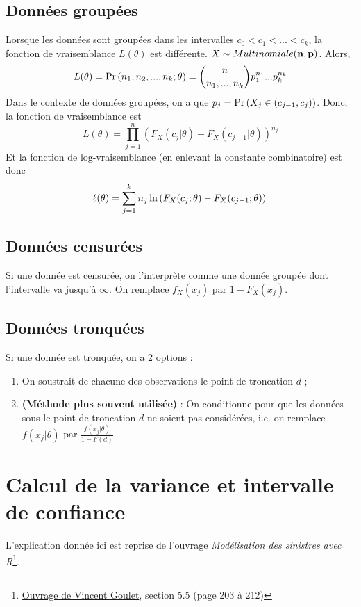 \documentclass[12pt, french]{report}
\begin{document}
\subsection{Données groupées}
Lorsque les données sont groupées dans les intervalles $c_0 < c_1 < ... < c_k$, la fonction de vraisemblance $L(\theta)$ est différente. $X \sim Multinomiale(\mathbf{n}, \mathbf{p})$. Alors,
\begin{equation}
L(\theta) = \Pr \left( n_1, n_2, ..., n_k ; \theta \right) = \binom{n}{n_1, ..., n_k} p_1^{n_1} ... p_k^{n_k}
\end{equation}
Dans le contexte de données groupées, on a que $p_j= \Pr \left( X_j \in (c_{j-1}, c_{j}) \right)$. Donc, la fonction de vraisemblance est
\[L(\theta) =  \prod_{j=1}^{n}  \left( F_X(c_{j} | \theta) - F_X(c_{j-1} | \theta) \right)^{n_j}   \]
Et la fonction de log-vraisemblance (en enlevant la constante combinatoire) est donc
\begin{equation}
\label{eq:log-vraisemblance_group}
\ell(\theta)  = \sum_{j=1}^{k} n_j \ln \left( F_X(c_{j} ; \theta) - F_X(c_{j-1} ; \theta) \right) \\
\end{equation}

\subsection{Données censurées}
Si une donnée est censurée, on l'interprète comme une donnée groupée dont l'intervalle va jusqu'à $\infty$. On remplace $f_X(x_j )$ par $1 - F_X(x_j )$.

\subsection{Données tronquées}
Si une donnée est tronquée, on a 2 options : 
\begin{enumerate}
\item On soustrait de chacune des observations le point de troncation $d$ ; 
\item \textbf{(Méthode plus souvent utilisée)} : On conditionne pour que les données sous le point de troncation $d$ ne soient pas considérées, i.e. on remplace $f(x_j | \theta)$ par $\frac{f(x_j | \theta)}{1 - F(d)}$. 
\end{enumerate}




\section{Calcul de la variance et intervalle de confiance}
L'explication donnée ici est reprise de l'ouvrage \emph{Modélisation des sinistres avec R}\footnote{\href{https://libre.act.ulaval.ca/fileadmin/Portail_libre/ACT-2005/Notes\%20de\%20cours/distributions_sinistres.pdf}{Ouvrage de Vincent Goulet}, section 5.5 (page 203 à 212)}.  \\
\end{document}
